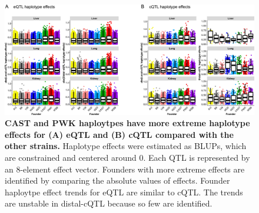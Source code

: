 \documentclass[10pt,letterpaper,twoside]{article}
\begin{document}
\begin{figure}[hp]
\renewcommand{\familydefault}{\sfdefault}\normalfont
\centering
\includegraphics[width=\textwidth, trim={0in 0in 0in 0in}, clip]{figs/all_qtl_effects_abs.png}
\caption{\textbf{CAST and PWK haploytpes have more extreme haplotype effects for (A) eQTL and (B) cQTL compared with the other strains.} 
Haplotype effects were estimated as BLUPs, which are constrained and centered around 0. Each QTL is represented by an 8-element effect vector. Founders with more extreme effects are identified by comparing the absolute values of effects. Founder haploytpe effect trends for eQTL are similar to cQTL. The trends are unstable in distal-cQTL because so few are identified.
\label{fig:qtl_effects_abs}}
\end{figure}

\clearpage
\end{document}
